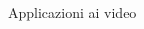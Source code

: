\documentclass[aspectratio=169]{beamer}
\begin{document}
\begin{frame}{Applicazioni ai video}
\begin{columns}[T]
\begin{column}{.33\textwidth}
            \begin{center}
            \end{center}
        \end{column}
    \end{columns}


\end{frame}
\end{document}
